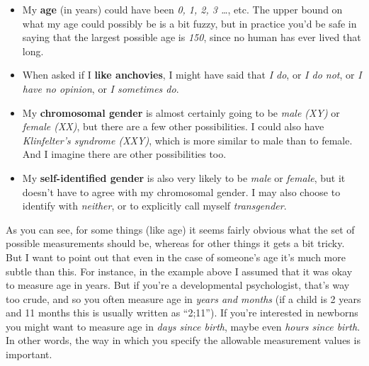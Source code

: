\begin{itemize}
\item My {\bf age} (in years) could have been {\it 0, 1, 2, 3 \ldots}, etc. The upper bound on what my age could possibly be is a bit fuzzy, but in practice you'd be safe in saying that the largest possible age is {\it 150}, since no human has ever lived that long.
\item When asked if I {\bf like anchovies}, I might have said that {\it I do}, or {\it I do not}, or {\it I have no opinion}, or {\it I sometimes do}. 
\item My {\bf chromosomal gender} is almost certainly going to be {\it male (XY)} or {\it female (XX)}, but there are a few other possibilities. I could also have {\it Klinfelter's syndrome (XXY)}, which is more similar to male than to female. And I imagine there are other possibilities too.
\item My {\bf self-identified gender} is also very likely to be {\it male} or {\it female}, but it doesn't have to agree with my chromosomal gender. I may also choose to identify with {\it neither}, or to explicitly call myself {\it transgender}.
\end{itemize}

As you can see, for some things (like age) it seems fairly obvious what the set of possible measurements should be, whereas for other things it gets a bit tricky. But I want to point out that even in the case of someone's age it's much more subtle than this. For instance, in the example above I assumed that it was okay to measure age in years. But if you're a developmental psychologist, that's way too crude, and so you often measure age in {\it years and months} (if a child is 2 years and 11 months this is usually written as ``2;11''). If you're interested in newborns you might want to measure age in {\it days since birth}, maybe even {\it hours since birth}. In other words, the way in which you specify the allowable measurement values is important. 

